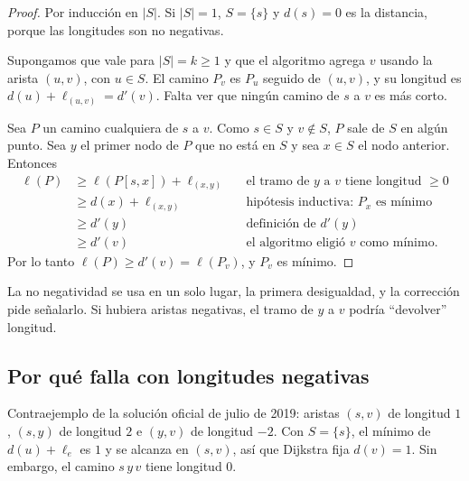 \begin{proof}
Por inducción en $|S|$. Si $|S|=1$, $S=\{s\}$ y $d(s)=0$ es la distancia, porque las longitudes son no negativas.

Supongamos que vale para $|S|=k\ge1$ y que el algoritmo agrega $v$ usando la arista $(u,v)$, con $u\in S$. El camino $P_v$ es $P_u$ seguido de $(u,v)$, y su longitud es $d(u)+\ell_{(u,v)}=d'(v)$. Falta ver que ningún camino de $s$ a $v$ es más corto.

Sea $P$ un camino cualquiera de $s$ a $v$. Como $s\in S$ y $v\notin S$, $P$ sale de $S$ en algún punto. Sea $y$ el primer nodo de $P$ que no está en $S$ y sea $x\in S$ el nodo anterior. Entonces
\begin{align*}
\ell(P) &\ge \ell(P[s,x]) + \ell_{(x,y)} && \text{el tramo de $y$ a $v$ tiene longitud $\ge 0$}\\
        &\ge d(x)+\ell_{(x,y)} && \text{hipótesis inductiva: $P_x$ es mínimo}\\
        &\ge d'(y) && \text{definición de $d'(y)$}\\
        &\ge d'(v) && \text{el algoritmo eligió $v$ como mínimo.}
\end{align*}
Por lo tanto $\ell(P)\ge d'(v)=\ell(P_v)$, y $P_v$ es mínimo.
\end{proof}

La no negatividad se usa en un solo lugar, la primera desigualdad, y la corrección pide señalarlo. Si hubiera aristas negativas, el tramo de $y$ a $v$ podría ``devolver'' longitud.

\subsection{Por qué falla con longitudes negativas}

Contraejemplo de la solución oficial de julio de 2019: aristas $(s,v)$ de longitud $1$, $(s,y)$ de longitud $2$ e $(y,v)$ de longitud $-2$. Con $S=\{s\}$, el mínimo de $d(u)+\ell_e$ es $1$ y se alcanza en $(s,v)$, así que Dijkstra fija $d(v)=1$. Sin embargo, el camino $s\,y\,v$ tiene longitud $0$.

\begin{center}
\end{center}

